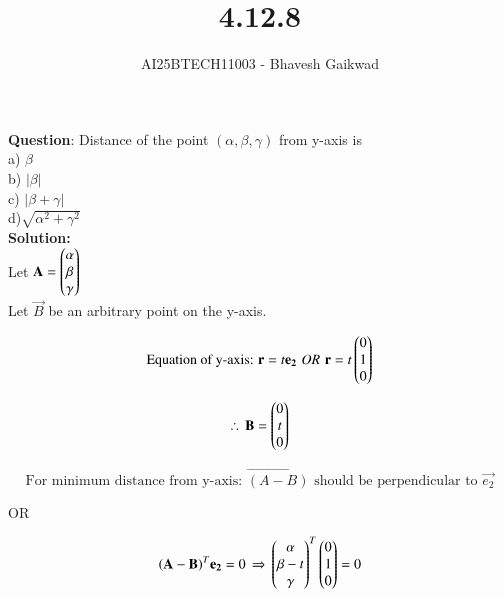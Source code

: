 \documentclass[journal]{IEEEtran}
\begin{document}

\vspace{3cm}

\title{4.12.8}
\author{AI25BTECH11003 - Bhavesh Gaikwad}
{\let\newpage\relax\maketitle}

\renewcommand{\thefigure}{\theenumi}
\renewcommand{\thetable}{\theenumi}
\setlength{\intextsep}{10pt} 


\renewcommand{\thetable}{\theenumi}


\textbf{Question}: Distance of the point $(\alpha, \beta, \gamma)$ from y-axis is\\
a) $\beta$\\
b) $|\beta|$\\
c) $|\beta + \gamma|$\\
d)$\sqrt{\alpha^2 + \gamma^2}$ \\

\textbf{Solution:}\\
Let $\mathbf{A} = \begin{pmatrix}\alpha \\ \beta \\ \gamma\end{pmatrix}$\\ 
Let $\vec{B}$ be an arbitrary point on the y-axis.

\begin{equation}
    \text{Equation of y-axis: } \mathbf{r} = t\mathbf{e_2} \, \,
    OR \, \, \mathbf{r}=t\begin{pmatrix}0 \\ 1 \\ 0\end{pmatrix}
\end{equation}

\begin{equation}
\therefore \, \mathbf{B}=\begin{pmatrix}0 \\ t \\0\end{pmatrix}
\end{equation}

\begin{equation}
\text{For minimum distance from y-axis: } \vec{(A-B)} \text{ should be perpendicular to } \vec{e_2}
\end{equation}

\begin{center}
    OR
\end{center}

\begin{equation}
\mathbf{(A-B)}^T\mathbf{e_2} =0 \, \Rightarrow \, \begin{pmatrix}\alpha \\ \beta-t \\ \gamma\end{pmatrix}^T\begin{pmatrix}0 \\ 1 \\ 0\end{pmatrix} = 0     
\end{equation}\\
\end{document}
